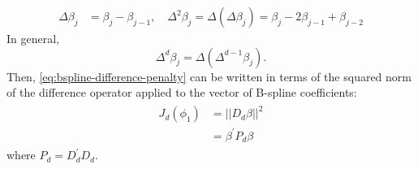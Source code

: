 \documentclass[12pt]{article}
\theoremstyle{definition}
\begin{document}
 \begin{align*}
 \Delta \beta_j &= \beta_j - \beta_{j-1}, \quad  \Delta^2 \beta_j = \Delta\left(\Delta \beta_j\right) = \beta_j - 2\beta_{j-1} + \beta_{j-2}
 \end{align*}
\noindent 
In general,
\begin{equation*}
\Delta^d \beta_j = \Delta\left(\Delta^{d-1} \beta_j \right).
\end{equation*} 
\noindent
Then, \ref{eq:bspline-difference-penalty} can be written in terms of the squared norm of the difference operator applied to the vector of B-spline coefficients:
\begin{align} 
\begin{split} \label{eq:bspline-difference-penalty-vector-form}
J_d\left( \phi_1 \right) &= \vert \vert D_d\beta \vert \vert^2 \\
&= \beta^\prime P_d \beta
\end{split}
\end{align}
\noindent
where $P_d = D_d^\prime D_d$.
\end{document}
